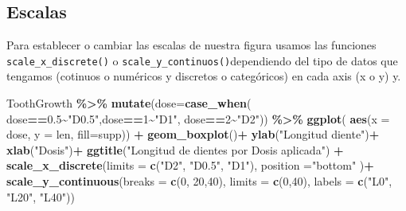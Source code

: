 \documentclass[
]{book}
\newenvironment{Shaded}{\begin{snugshade}}{\end{snugshade}}
\newcommand{\AttributeTok}[1]{\textcolor[rgb]{0.13,0.29,0.53}{#1}}
\newcommand{\DecValTok}[1]{\textcolor[rgb]{0.00,0.00,0.81}{#1}}
\newcommand{\FloatTok}[1]{\textcolor[rgb]{0.00,0.00,0.81}{#1}}
\newcommand{\FunctionTok}[1]{\textcolor[rgb]{0.13,0.29,0.53}{\textbf{#1}}}
\newcommand{\NormalTok}[1]{#1}
\newcommand{\SpecialCharTok}[1]{\textcolor[rgb]{0.81,0.36,0.00}{\textbf{#1}}}
\newcommand{\StringTok}[1]{\textcolor[rgb]{0.31,0.60,0.02}{#1}}
\begin{document}
\subsection{Escalas}\label{escalas}

Para establecer o cambiar las escalas de nuestra figura usamos las funciones \texttt{scale\_x\_discrete()} o \texttt{scale\_y\_continuos()}dependiendo del tipo de datos que tengamos (cotinuos o numéricos y discretos o categóricos) en cada axis (x o y) y.

\begin{Shaded}
\begin{Highlighting}[]
\NormalTok{ToothGrowth }\SpecialCharTok{\%\textgreater{}\%}  \FunctionTok{mutate}\NormalTok{(}\AttributeTok{dose=}\FunctionTok{case\_when}\NormalTok{(}
\NormalTok{  dose}\SpecialCharTok{==}\FloatTok{0.5}\SpecialCharTok{\textasciitilde{}}\StringTok{"D0.5"}\NormalTok{,dose}\SpecialCharTok{==}\DecValTok{1}\SpecialCharTok{\textasciitilde{}}\StringTok{"D1"}\NormalTok{, dose}\SpecialCharTok{==}\DecValTok{2}\SpecialCharTok{\textasciitilde{}}\StringTok{"D2"}\NormalTok{)) }\SpecialCharTok{\%\textgreater{}\%} \FunctionTok{ggplot}\NormalTok{(}
    \FunctionTok{aes}\NormalTok{(}\AttributeTok{x =}\NormalTok{ dose, }\AttributeTok{y =}\NormalTok{ len, }\AttributeTok{fill=}\NormalTok{supp)) }\SpecialCharTok{+}  \FunctionTok{geom\_boxplot}\NormalTok{()}\SpecialCharTok{+}
  \FunctionTok{ylab}\NormalTok{(}\StringTok{"Longitud diente"}\NormalTok{)}\SpecialCharTok{+}
  \FunctionTok{xlab}\NormalTok{(}\StringTok{"Dosis"}\NormalTok{)}\SpecialCharTok{+}
  \FunctionTok{ggtitle}\NormalTok{(}\StringTok{"Longitud de dientes por Dosis aplicada"}\NormalTok{) }\SpecialCharTok{+}
  \FunctionTok{scale\_x\_discrete}\NormalTok{(}\AttributeTok{limits =} \FunctionTok{c}\NormalTok{(}\StringTok{"D2"}\NormalTok{, }\StringTok{"D0.5"}\NormalTok{, }\StringTok{"D1"}\NormalTok{), }\AttributeTok{position =}\StringTok{"bottom"}\NormalTok{ )}\SpecialCharTok{+}
  \FunctionTok{scale\_y\_continuous}\NormalTok{(}\AttributeTok{breaks =} \FunctionTok{c}\NormalTok{(}\DecValTok{0}\NormalTok{, }\DecValTok{20}\NormalTok{,}\DecValTok{40}\NormalTok{), }\AttributeTok{limits =} \FunctionTok{c}\NormalTok{(}\DecValTok{0}\NormalTok{,}\DecValTok{40}\NormalTok{), }\AttributeTok{labels =} \FunctionTok{c}\NormalTok{(}\StringTok{"L0"}\NormalTok{, }\StringTok{"L20"}\NormalTok{, }\StringTok{"L40"}\NormalTok{))}
\end{Highlighting}
\end{Shaded}
\end{document}
